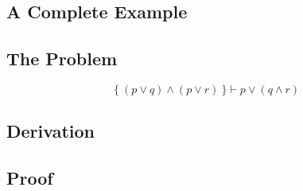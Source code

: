 \documentclass[../main.tex]{subfiles}
\begin{document}
\begin{subappendices}
\renewcommand{\thesection}{\Alph{section}}%

\section{A Complete Example}

\subsection{The Problem}

\begin{equation*}
\{\ (p ∨ q) ∧ (p ∨ r)\ \} \vdash p ∨ (q ∧ r)
\end{equation*}

\subsection{\TSTP Derivation}


\subsection{\Agda Proof}

\end{subappendices}
\end{document}
